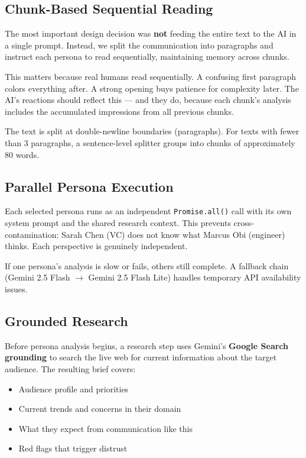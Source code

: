 \documentclass[a4paper, 11pt, twocolumn]{article}
\begin{document}
\subsection{Chunk-Based Sequential Reading}

The most important design decision was \textbf{not} feeding the entire text to the AI in a single prompt. Instead, we split the communication into paragraphs and instruct each persona to read sequentially, maintaining memory across chunks.

This matters because real humans read sequentially. A confusing first paragraph colors everything after. A strong opening buys patience for complexity later. The AI's reactions should reflect this --- and they do, because each chunk's analysis includes the accumulated impressions from all previous chunks.

The text is split at double-newline boundaries (paragraphs). For texts with fewer than 3 paragraphs, a sentence-level splitter groups into chunks of approximately 80 words.

\subsection{Parallel Persona Execution}

Each selected persona runs as an independent \texttt{Promise.all()} call with its own system prompt and the shared research context. This prevents cross-contamination: Sarah Chen (VC) does not know what Marcus Obi (engineer) thinks. Each perspective is genuinely independent.

If one persona's analysis is slow or fails, others still complete. A fallback chain (Gemini 2.5 Flash $\to$ Gemini 2.5 Flash Lite) handles temporary API availability issues.

\subsection{Grounded Research}

Before persona analysis begins, a research step uses Gemini's \textbf{Google Search grounding} to search the live web for current information about the target audience. The resulting brief covers:
\begin{itemize}[nosep, leftmargin=1.2em]
    \item Audience profile and priorities
    \item Current trends and concerns in their domain
    \item What they expect from communication like this
    \item Red flags that trigger distrust
\end{itemize}
\end{document}
